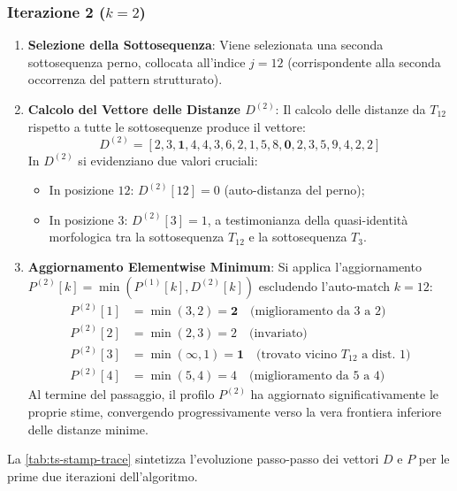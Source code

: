 \subsubsection{Iterazione 2 ($k = 2$)}
\begin{enumerate}
    \item \textbf{Selezione della Sottosequenza}: Viene selezionata una seconda sottosequenza perno, collocata all'indice $j = 12$ (corrispondente alla seconda occorrenza del pattern strutturato).
    \item \textbf{Calcolo del Vettore delle Distanze $D^{(2)}$}: Il calcolo delle distanze da $T_{12}$ rispetto a tutte le sottosequenze produce il vettore:
    \begin{equation}
    D^{(2)} = [2, 3, \mathbf{1}, 4, 4, 3, 6, 2, 1, 5, 8, \mathbf{0}, 2, 3, 5, 9, 4, 2, 2]
    \end{equation}
    In $D^{(2)}$ si evidenziano due valori cruciali:
    \begin{itemize}
        \item In posizione $12$: $D^{(2)}[12] = 0$ (auto-distanza del perno);
        \item In posizione $3$: $D^{(2)}[3] = 1$, a testimonianza della quasi-identit\`a morfologica tra la sottosequenza $T_{12}$ e la sottosequenza $T_3$.
    \end{itemize}
    
    \item \textbf{Aggiornamento Elementwise Minimum}:
    Si applica l'aggiornamento $P^{(2)}[k] = \min(P^{(1)}[k], D^{(2)}[k])$ escludendo l'auto-match $k = 12$:
    \begin{align}
    P^{(2)}[1] &= \min(3, 2) = \mathbf{2} \quad \text{(miglioramento da } 3 \text{ a } 2\text{)} \\
    P^{(2)}[2] &= \min(2, 3) = 2 \quad \text{(invariato)} \\
    P^{(2)}[3] &= \min(\infty, 1) = \mathbf{1} \quad \text{(trovato vicino } T_{12} \text{ a dist. } 1\text{)} \\
    P^{(2)}[4] &= \min(5, 4) = 4 \quad \text{(miglioramento da } 5 \text{ a } 4\text{)}
    \end{align}
    Al termine del passaggio, il profilo $P^{(2)}$ ha aggiornato significativamente le proprie stime, convergendo progressivamente verso la vera frontiera inferiore delle distanze minime.
\end{enumerate}

La \autoref{tab:ts-stamp-trace} sintetizza l'evoluzione passo-passo dei vettori $D$ e $P$ per le prime due iterazioni dell'algoritmo.

